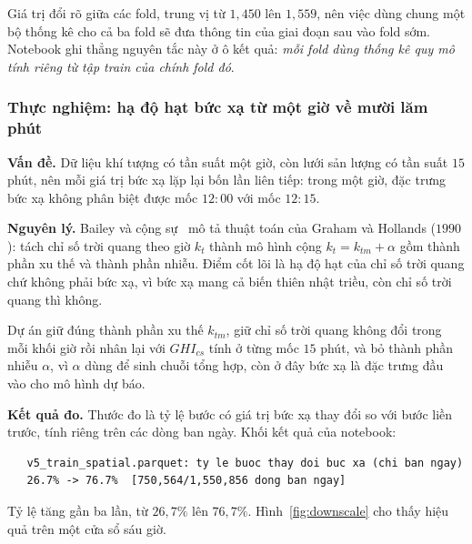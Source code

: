 Giá trị đổi rõ giữa các fold, trung vị từ $1{,}450$ lên $1{,}559$, nên việc dùng chung
một bộ thống kê cho cả ba fold sẽ đưa thông tin của giai đoạn sau vào fold sớm. Notebook ghi
thẳng nguyên tắc này ở ô kết quả: \textit{mỗi fold dùng thống kê quy mô tính riêng từ tập
train của chính fold đó}.

\subsubsection{Thực nghiệm: hạ độ hạt bức xạ từ một giờ về mười lăm phút}

\textbf{Vấn đề.} Dữ liệu khí tượng có tần suất một giờ, còn lưới sản lượng có tần suất $15$
phút, nên mỗi giá trị bức xạ lặp lại bốn lần liên tiếp: trong một giờ, đặc trưng bức xạ không
phân biệt được mốc $12{:}00$ với mốc $12{:}15$.

\textbf{Nguyên lý.} Bailey và cộng sự~\cite{bailey2024} mô tả thuật toán của Graham và
Hollands ($1990$): tách chỉ số trời quang theo giờ $k_t$ thành mô hình cộng
$k_t = k_{tm} + \alpha$ gồm thành phần xu thế và thành phần nhiễu. Điểm cốt lõi là hạ độ hạt của chỉ số trời quang chứ không phải bức xạ, vì bức xạ mang cả biến thiên nhật
triều, còn chỉ số trời quang thì không.

Dự án giữ đúng thành phần xu thế $k_{tm}$, giữ chỉ số trời quang không đổi trong mỗi khối
giờ rồi nhân lại với $GHI_{cs}$ tính ở từng mốc $15$ phút, và bỏ thành phần nhiễu $\alpha$,
vì $\alpha$ dùng để sinh chuỗi tổng hợp, còn ở đây bức xạ là đặc trưng đầu vào cho mô hình
dự báo.

\textbf{Kết quả đo.} Thước đo là tỷ lệ bước có giá trị bức xạ thay đổi so với bước liền
trước, tính riêng trên các dòng ban ngày. Khối kết quả của notebook:

\begingroup
\par{}\vspace{8pt}
\footnotesize\renewcommand{\baselinestretch}{1.0}\selectfont
\begin{verbatim}
   v5_train_spatial.parquet: ty le buoc thay doi buc xa (chi ban ngay)
   26.7% -> 76.7%  [750,564/1,550,856 dong ban ngay]
\end{verbatim}
\par\vspace{8pt}
\endgroup
Tỷ lệ tăng gần ba lần, từ $26{,}7\%$ lên $76{,}7\%$. Hình~\ref{fig:downscale} cho thấy hiệu
quả trên một cửa sổ sáu giờ.

